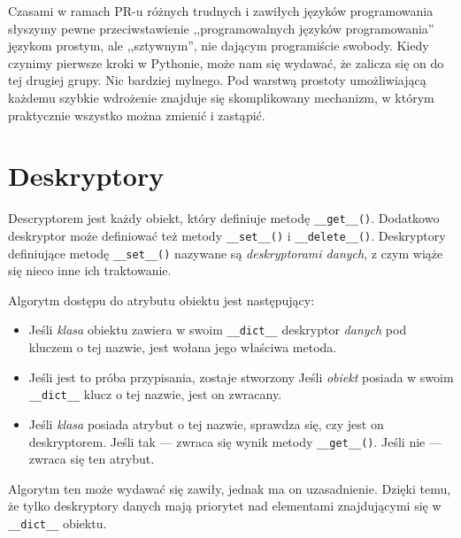 
Czasami w ramach PR-u różnych trudnych i zawiłych języków programowania słyszymy
pewne przeciwstawienie ,,programowalnych języków programowania'' językom
prostym, ale ,,sztywnym'', nie dającym programiście swobody. Kiedy czynimy
pierwsze kroki w Pythonie, może nam się wydawać, że zalicza się on do tej
drugiej grupy. Nic bardziej mylnego. Pod warstwą prostoty umożliwiającą każdemu
szybkie wdrożenie znajduje się skomplikowany mechanizm, w którym praktycznie
wszystko można zmienić i zastąpić. 

\section{Deskryptory}
Descryptorem jest każdy obiekt, który definiuje metodę \verb|__get__()|.
Dodatkowo deskryptor może definiować też metody \verb|__set__()| i
\verb|__delete__()|. Deskryptory definiujące metodę \verb|__set__()| nazywane są
\emph{deskryptorami danych}, z czym wiąże się nieco inne ich traktowanie.

Algorytm dostępu do atrybutu obiektu jest następujący:
\begin{itemize}
\item
Jeśli \emph{klasa} obiektu zawiera w swoim \verb|__dict__| deskryptor
\emph{danych} pod kluczem o tej nazwie, jest wołana jego właściwa metoda.
\item
Jeśli jest to próba przypisania, zostaje stworzony Jeśli \emph{obiekt} posiada w swoim \verb|__dict__| klucz o tej nazwie,
jest on zwracany.
\item
Jeśli \emph{klasa} posiada atrybut o tej nazwie, sprawdza się, czy jest on
deskryptorem. Jeśli tak --- zwraca się wynik metody \verb|__get__()|. Jeśli nie
--- zwraca się ten atrybut.
\end{itemize}

Algorytm ten może wydawać się zawiły, jednak ma on uzasadnienie. Dzięki temu, że
tylko deskryptory danych mają priorytet nad elementami znajdującymi się w
\verb|__dict__| obiektu.


